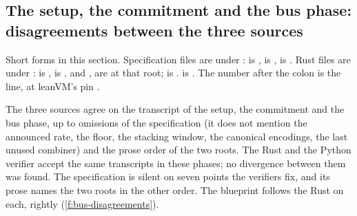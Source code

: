 \subsection{The setup, the commitment and the bus phase: disagreements between the three sources}\label{sec:gen-bus-disagreements}

\begin{sloppypar}
Short forms in this section. Specification files are under :
 is ,  is ,
 is . Rust files are under :
 is ,  is , and ,
 are at that root;  is .  is
. The number after the colon is the line, at leanVM's pin
.
\end{sloppypar}

The three sources agree on the transcript of the setup, the commitment and the bus phase, up to
omissions of the specification (it does not mention the announced rate, the  floor,
the stacking window, the canonical encodings, the last unused combiner) and the prose order of
the two roots. The Rust and the Python verifier accept the same transcripts in these phases; no
divergence between them was found. The specification is silent on seven points the verifiers
fix, and its prose names the two roots in the other order. The blueprint follows the Rust on
each, rightly (\cref{f:bus-disagreements}).

